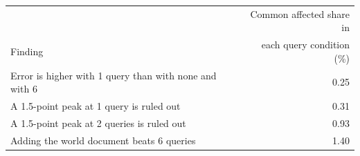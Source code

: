 \begin{tabular}{lr}
\toprule
 & Common affected share in \\
Finding & each query condition (\%) \\
\midrule
Error is higher with 1 query than with none and with 6 & 0.25 \\
A 1.5-point peak at 1 query is ruled out & 0.31 \\
A 1.5-point peak at 2 queries is ruled out & 0.93 \\
Adding the world document beats 6 queries & 1.40 \\
\bottomrule
\end{tabular}
